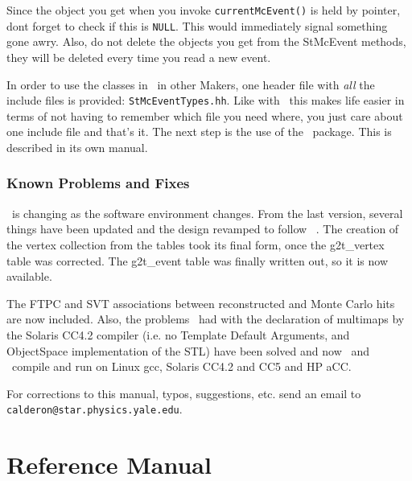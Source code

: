 Since the  object you get when you invoke
{\tt currentMcEvent()} is held by pointer, dont forget to
check if this is {\tt NULL}. This would immediately signal
something gone awry.  Also, do not delete the objects
you get from the StMcEvent methods, they will be deleted
every time you read a new event.

In order to use the classes in
\StMcEvent\ in other Makers, one header file with {\it all} the include files
is provided: {\tt StMcEventTypes.hh}. 
Like with \StEvent\ this makes
life easier in terms of not having to remember which file you need where,
you just care about one include file and that's it.  
The next step is the use of the \StAssociationMaker\ package.  This is described
in its own manual.


\section{Known Problems and Fixes}

\StMcEvent\ is changing as the software environment changes.  From the last
version, several things have been updated and the design revamped to
follow \StEvent\ .
The creation of the vertex collection from the tables took its final
form, once the g2t\_vertex table was corrected.  The g2t\_event table was
finally written out, so it is now available.

The FTPC and SVT associations between reconstructed and Monte Carlo
hits are now included.
Also, the problems \StAssociationMaker\ had with the declaration of multimaps
by the Solaris CC4.2 compiler (i.e. no Template Default Arguments, and
ObjectSpace implementation of the STL) have been solved and
now \StMcEvent\ and \StAssociationMaker\ compile and run
on Linux gcc, Solaris CC4.2 and CC5 and HP aCC.

For corrections to this manual, typos, suggestions, etc. send an email
to {\tt calderon@star.physics.yale.edu}.
\clearpage

%
%
\part{Reference Manual}
\label{sec:refman}
\clearpage

